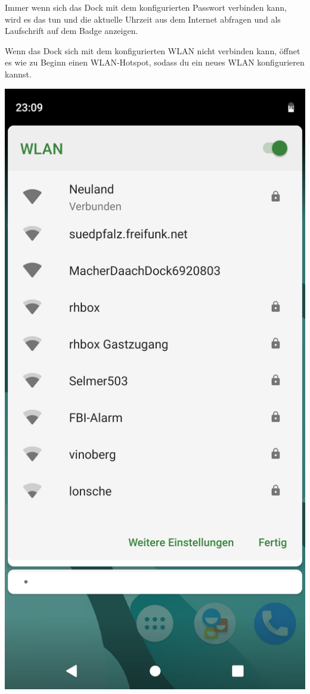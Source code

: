\documentclass{article}
\begin{document}
Immer wenn sich das Dock mit dem konfigurierten Passwort verbinden kann, wird es das tun und die aktuelle Uhrzeit aus dem Internet abfragen und als Laufschrift auf dem Badge anzeigen.

Wenn das Dock sich mit dem konfigurierten WLAN nicht verbinden kann, öffnet es wie zu Beginn einen WLAN-Hotspot, sodass du ein neues WLAN konfigurieren kannst.

\vspace{1cm}

\begin{minipage}[b]{0.5\textwidth}
	\includegraphics[width=\textwidth]{Bilder2019/Screenshot_20190918-230918_Nova_Launcher.png}
\end{minipage}
\end{document}
